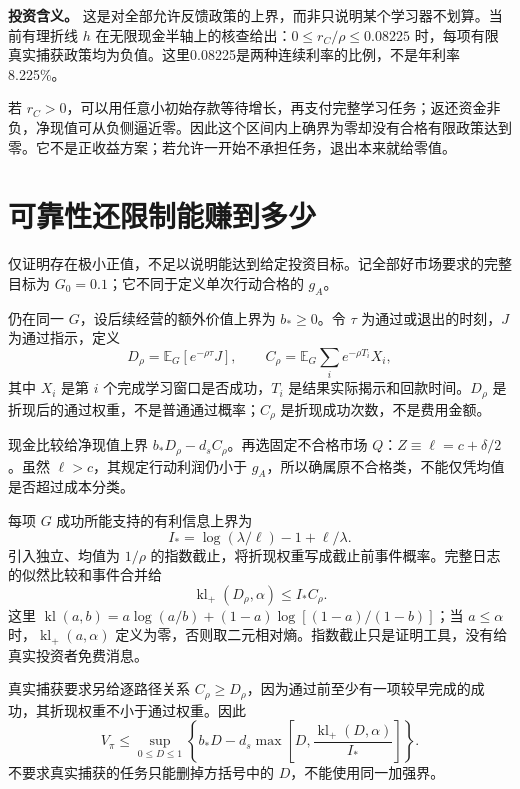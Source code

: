 \documentclass[UTF8,fontset=windows,11pt,a4paper]{ctexart}
\numberwithin{equation}{section}
\begin{document}
\noindent\textbf{投资含义。}
这是对全部允许反馈政策的上界，而非只说明某个学习器不划算。当前有理折线 $h$ 在无限现金半轴上的核查给出：$0\le r_C/\rho\le0.08225$ 时，每项有限真实捕获政策均为负值。这里0.08225是两种连续利率的比例，不是年利率8.225\%。

若 $r_C>0$，可以用任意小初始存款等待增长，再支付完整学习任务；返还资金非负，净现值可从负侧逼近零。因此这个区间内上确界为零却没有合格有限政策达到零。它不是正收益方案；若允许一开始不承担任务，退出本来就给零值。

\section{可靠性还限制能赚到多少}
仅证明存在极小正值，不足以说明能达到给定投资目标。记全部好市场要求的完整目标为 $G_0=0.1$；它不同于定义单次行动合格的 $g_A$。

仍在同一 $G$，设后续经营的额外价值上界为 $b_*\ge0$。令 $\tau$ 为通过或退出的时刻，$J$ 为通过指示，定义
\begin{equation}
 D_\rho=\mathbb E_G[e^{-\rho\tau}J],\qquad
 C_\rho=\mathbb E_G\sum_i e^{-\rho T_i}X_i,
\end{equation}
其中 $X_i$ 是第 $i$ 个完成学习窗口是否成功，$T_i$ 是结果实际揭示和回款时间。$D_\rho$ 是折现后的通过权重，不是普通通过概率；$C_\rho$ 是折现成功次数，不是费用金额。

现金比较给净现值上界 $b_*D_\rho-d_sC_\rho$。再选固定不合格市场 $Q$：$Z\equiv\ell=c+\delta/2$。虽然 $\ell>c$，其规定行动利润仍小于 $g_A$，所以确属原不合格类，不能仅凭均值是否超过成本分类。

每项 $G$ 成功所能支持的有利信息上界为
\begin{equation}
 I_* =\log(\lambda/\ell)-1+\ell/\lambda.
\end{equation}
引入独立、均值为 $1/\rho$ 的指数截止，将折现权重写成截止前事件概率。完整日志的似然比较和事件合并给
\begin{equation}\label{eq:info}
 \operatorname{kl}_+(D_\rho,\alpha)\le I_*C_\rho.
\end{equation}
这里 $\operatorname{kl}(a,b)=a\log(a/b)+(1-a)\log[(1-a)/(1-b)]$；当 $a\le\alpha$ 时，$\operatorname{kl}_+(a,\alpha)$ 定义为零，否则取二元相对熵。指数截止只是证明工具，没有给真实投资者免费消息。

真实捕获要求另给逐路径关系 $C_\rho\ge D_\rho$，因为通过前至少有一项较早完成的成功，其折现权重不小于通过权重。因此
\begin{equation}
 V_\pi\le\sup_{0\le D\le1}
 \left\{b_*D-d_s\max\left[D,\frac{\operatorname{kl}_+(D,\alpha)}{I_*}\right]\right\}.
\end{equation}
不要求真实捕获的任务只能删掉方括号中的 $D$，不能使用同一加强界。
\end{document}
